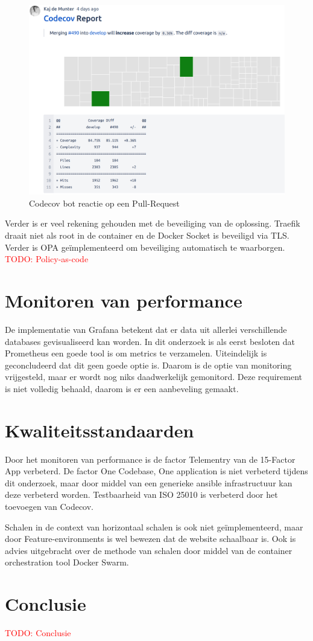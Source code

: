 \begin{figure}[H]
	\centering
	\includegraphics[width=13cm]{Figures/coverage}
	\decoRule
	\caption[Codecov bot]{Codecov bot reactie op een Pull-Request}
	\label{fig:coverage}
\end{figure}

Verder is er veel rekening gehouden met de beveiliging van de oplossing. Traefik draait niet als root in de container en de Docker Socket is beveiligd via TLS. Verder is OPA geïmplementeerd om beveiliging automatisch te waarborgen. \textcolor{red}{TODO: Policy-as-code} %

\section{Monitoren van performance}

De implementatie van Grafana betekent dat er data uit allerlei verschillende databases gevisualiseerd kan worden. In dit onderzoek is als eerst besloten dat Prometheus een goede tool is om metrics te verzamelen. Uiteindelijk is geconcludeerd dat dit geen goede optie is. Daarom is de optie van monitoring vrijgesteld, maar er wordt nog niks daadwerkelijk gemonitord. Deze requirement is niet volledig behaald, daarom is er een aanbeveling gemaakt.

\section{Kwaliteitsstandaarden}
Door het monitoren van performance is de factor Telementry van de 15-Factor App verbeterd. De factor One Codebase, One application is niet verbeterd tijdens dit onderzoek, maar door middel van een generieke ansible infrastructuur kan deze verbeterd worden. Testbaarheid van ISO 25010 is verbeterd door het toevoegen van Codecov. 

Schalen in de context van horizontaal schalen is ook niet geïmplementeerd, maar door Feature-environments is wel bewezen dat de website schaalbaar is. Ook is advies uitgebracht over de methode van schalen door middel van de container orchestration tool Docker Swarm.

\section{Conclusie}

\textcolor{red}{TODO: Conclusie} %
